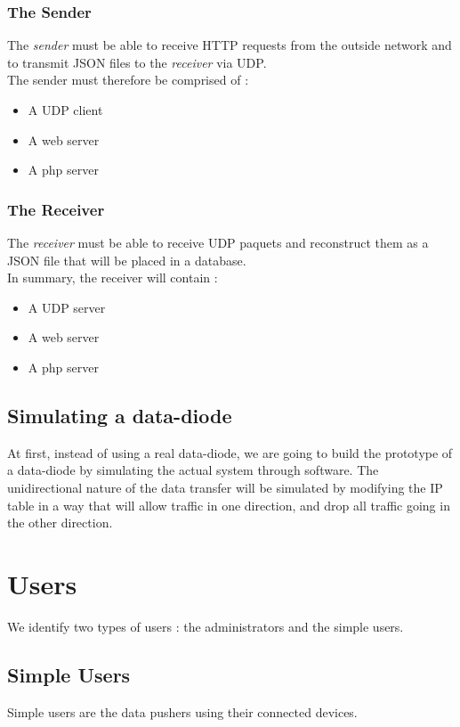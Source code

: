 \documentclass[a4paper,11pt]{article}
\begin{document}
\subsubsection{The Sender}
The \textit{sender} must be able to receive HTTP requests from the outside network and to transmit JSON files to the \textit{receiver} via UDP.\\

The sender must therefore be comprised of :
\begin{itemize}
\item{A UDP client}
\item{A web server}
\item{A php server}
\end{itemize} 

\subsubsection{The Receiver}
The \textit{receiver} must be able to receive UDP paquets and reconstruct them as a JSON file that will be placed in a database. \\

In summary, the receiver will contain :
\begin{itemize}
\item{A UDP server}
\item{A web server}
\item{A php server}
\end{itemize}

\subsection{Simulating a data-diode}
At first, instead of using a real data-diode, we are going to build the prototype of a data-diode by simulating the actual system through software. The unidirectional nature of the data transfer will be simulated by modifying the IP table in a way that will allow traffic in one direction, and drop all traffic going in the other direction.


\section{Users}
We identify two types of users : the administrators and the simple users.

\subsection{Simple Users}
Simple users are the data pushers using their connected devices.
\end{document}
